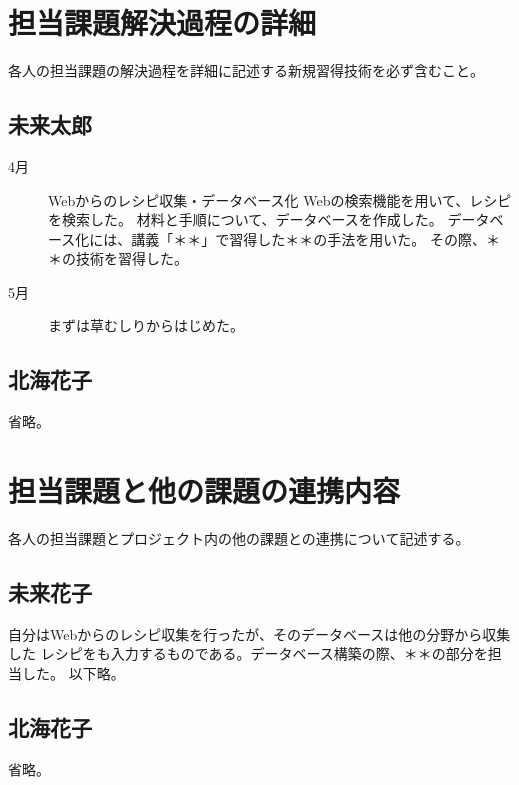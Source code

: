 \documentclass[openany,11pt,papersize]{jsbook}
\begin{document}

\section{担当課題解決過程の詳細}
\begin{hissu}
各人の担当課題の解決過程を詳細に記述する新規習得技術を必ず含むこと。
\end{hissu}

\subsection{未来太郎}
\begin{description}
 \item[4月] Webからのレシピ収集・データベース化 
Webの検索機能を用いて、レシピを検索した。 
材料と手順について、データベースを作成した。 
データベース化には、講義「＊＊」で習得した＊＊の手法を用いた。 
その際、＊＊の技術を習得した。　　
 \item[5月]まずは草むしりからはじめた。
\end{description}



\subsection{北海花子}

省略。


\section{担当課題と他の課題の連携内容}
\begin{hissu}
各人の担当課題とプロジェクト内の他の課題との連携について記述する。
\end{hissu}

\subsection{未来花子}
自分はWebからのレシピ収集を行ったが、そのデータベースは他の分野から収集した 
レシピをも入力するものである。データベース構築の際、＊＊の部分を担当した。
以下略。

\subsection{北海花子}
省略。
\end{document}
